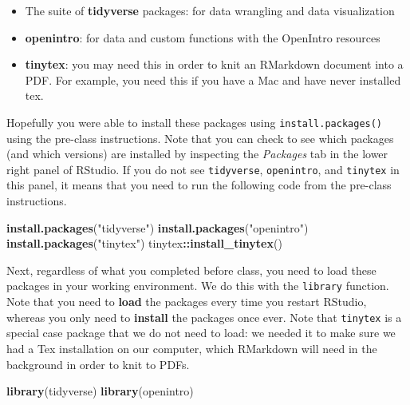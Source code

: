 \documentclass[
]{article}
\newenvironment{Shaded}{\begin{snugshade}}{\end{snugshade}}
\newcommand{\FunctionTok}[1]{\textcolor[rgb]{0.13,0.29,0.53}{\textbf{#1}}}
\newcommand{\NormalTok}[1]{#1}
\newcommand{\SpecialCharTok}[1]{\textcolor[rgb]{0.81,0.36,0.00}{\textbf{#1}}}
\newcommand{\StringTok}[1]{\textcolor[rgb]{0.31,0.60,0.02}{#1}}
\providecommand{\tightlist}{%
  \setlength{\itemsep}{0pt}\setlength{\parskip}{0pt}}
\begin{document}
\begin{itemize}
\tightlist
\item
  The suite of \textbf{tidyverse} packages: for data wrangling and data
  visualization
\item
  \textbf{openintro}: for data and custom functions with the OpenIntro
  resources
\item
  \textbf{tinytex}: you may need this in order to knit an RMarkdown
  document into a PDF. For example, you need this if you have a Mac and
  have never installed tex.
\end{itemize}

Hopefully you were able to install these packages using
\texttt{install.packages()} using the pre-class instructions. Note that
you can check to see which packages (and which versions) are installed
by inspecting the \emph{Packages} tab in the lower right panel of
RStudio. If you do not see \texttt{tidyverse}, \texttt{openintro}, and
\texttt{tinytex} in this panel, it means that you need to run the
following code from the pre-class instructions.

\begin{Shaded}
\begin{Highlighting}[]
\FunctionTok{install.packages}\NormalTok{(}\StringTok{"tidyverse"}\NormalTok{)}
\FunctionTok{install.packages}\NormalTok{(}\StringTok{"openintro"}\NormalTok{)}
\FunctionTok{install.packages}\NormalTok{(}\StringTok{"tinytex"}\NormalTok{)}
\NormalTok{tinytex}\SpecialCharTok{::}\FunctionTok{install\_tinytex}\NormalTok{()}
\end{Highlighting}
\end{Shaded}

Next, regardless of what you completed before class, you need to load
these packages in your working environment. We do this with the
\texttt{library} function. Note that you need to \textbf{load} the
packages every time you restart RStudio, whereas you only need to
\textbf{install} the packages once ever. Note that \texttt{tinytex} is a
special case package that we do not need to load: we needed it to make
sure we had a Tex installation on our computer, which RMarkdown will
need in the background in order to knit to PDFs.

\begin{Shaded}
\begin{Highlighting}[]
\FunctionTok{library}\NormalTok{(tidyverse)}
\FunctionTok{library}\NormalTok{(openintro)}
\end{Highlighting}
\end{Shaded}
\end{document}
